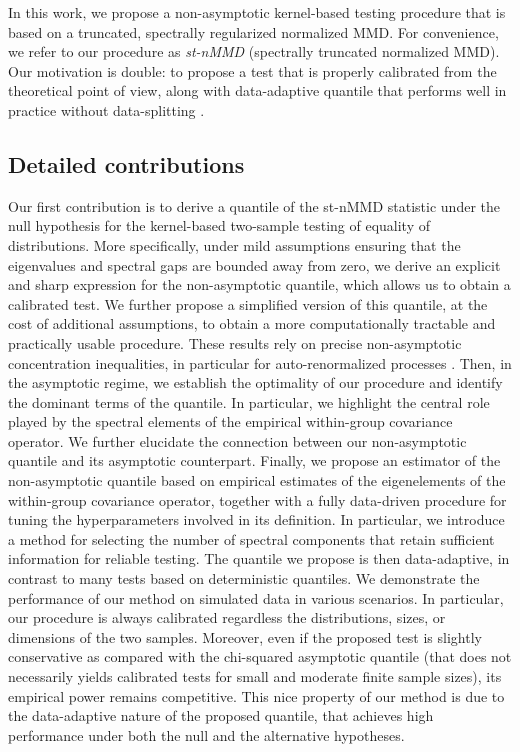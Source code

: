 \documentclass[twoside,11pt]{article}
\begin{document}
In this work, we propose a non-asymptotic kernel-based testing procedure that is based on a truncated, spectrally regularized normalized MMD. For convenience, we refer to our procedure as \textit{st-nMMD} (spectrally truncated normalized MMD). Our motivation is double: to propose a test that is properly calibrated from the theoretical point of view, along with data-adaptive quantile that performs well in practice without data-splitting \citep{hagrass2024spectral}.

\subsection{Detailed contributions}
Our first contribution is to derive a quantile of the st-nMMD statistic under the null hypothesis for the kernel-based two-sample testing of equality of distributions. More specifically, under mild assumptions ensuring that the eigenvalues and spectral gaps are bounded away from zero, we derive an explicit and sharp expression for the non-asymptotic quantile, which allows us to obtain a calibrated test. We further propose a simplified version of this quantile, at the cost of additional assumptions, to obtain a more computationally tractable and practically usable procedure. These results rely on precise non-asymptotic concentration inequalities, in particular for auto-renormalized processes \citep{bertail2008exponential}. Then, in the asymptotic regime, we establish the optimality of our procedure and identify the dominant terms of the quantile. In particular, we highlight the central role played by the spectral elements of the empirical within-group covariance operator. We further elucidate the connection between our non-asymptotic quantile and its asymptotic counterpart. Finally, we propose an estimator of the non-asymptotic quantile based on empirical estimates of the eigenelements of the within-group covariance operator, together with a fully data-driven procedure for tuning the hyperparameters involved in its definition. In particular, we introduce a method for selecting the number of spectral components that retain sufficient information for reliable testing. The quantile we propose is then data-adaptive, in contrast to many tests based on deterministic quantiles. We demonstrate the performance of our method on simulated data in various scenarios. In particular, our procedure is always calibrated regardless the distributions, sizes, or dimensions of the two samples. Moreover, even if the proposed test is slightly conservative as compared with the chi-squared asymptotic quantile (that does not necessarily yields calibrated tests for small and moderate finite sample sizes), its empirical power remains competitive. This nice property of our method is due to the data-adaptive nature of the proposed quantile, that achieves high performance under both the null and the alternative hypotheses.
\end{document}
